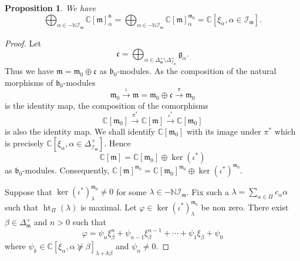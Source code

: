 \documentclass{amsart}
\newtheorem{proposition}[theorem]{Proposition}
\theoremstyle{definition}
\theoremstyle{remark}
\numberwithin{equation}{section}
\newcommand{\height}{\mathop{\mathrm{ht}}\nolimits}
\newcommand{\soc}[1]{\mathcal{I}_{#1}}
\begin{document}
\begin{proposition}\label{invariant-prop}
We have
$$
\bigoplus_{\alpha\in -\mathbb{N}\soc{\mathfrak{m}}} \mathbb{C} [\mathfrak{m}]_{\alpha}^{\mathfrak{n}}
=
\bigoplus_{\alpha\in -\mathbb{N}\soc{\mathfrak{m}}} \mathbb{C} [\mathfrak{m}]_{\alpha}^{\mathfrak{m}_{0}}
= \mathbb{C}[ \xi_{\alpha} , \alpha \in \soc{\mathfrak{m}}].
$$
\end{proposition}
\begin{proof}
Let 
$$
\mathfrak{c} = \bigoplus_{\alpha\in\Delta_{\mathfrak{m}}^{+} \setminus \Delta_{\soc{\mathfrak{m}}}^{+}}
\mathfrak{g}_{\alpha}.
$$
Thus we have $\mathfrak{m} = \mathfrak{m}_{0} \oplus \mathfrak{c}$ as $\mathfrak{b}_{0}$-modules.
As the composition of the natural morphisms of $\mathfrak{b}_{0}$-modules
$$
\mathfrak{m}_{0}\stackrel{\iota}{\longrightarrow} \mathfrak{m} =\mathfrak{m}_{0} \oplus \mathfrak{c} 
\stackrel{\pi}{\longrightarrow} \mathfrak{m}_{0}
$$
is the identity map, the composition of the comorphisms
$$
\mathbb{C}[ \mathfrak{m}_{0}] \stackrel{\pi^{*}}{\longrightarrow} 
\mathbb{C}[ \mathfrak{m}] \stackrel{\iota^{*}}{\longrightarrow} \mathbb{C}[\mathfrak{m}_{0}]
$$
is also the identity map. We shall identify $\mathbb{C}[\mathfrak{m}_{0}]$ with its image under $\pi^{*}$ 
which is precisely $\mathbb{C}[ \xi_{\alpha} , \alpha \in \Delta_{\soc{\mathfrak{m}}}^{+}]$. Hence 
$$
\mathbb{C}[ \mathfrak{m}]  = \mathbb{C}[ \mathfrak{m}_{0}] \oplus \ker (\iota^{*})
$$
as $\mathfrak{b}_{0}$-modules. Consequently, $\mathbb{C}[ \mathfrak{m}]^{\mathfrak{m}_{0}}
= \mathbb{C}[ \mathfrak{m}_{0}]^{\mathfrak{m}_{0}} \oplus \ker (\iota^{*})^{\mathfrak{m}_{0}}$.

Suppose that $\ker (\iota^{*})^{\mathfrak{m}_{0}}_{\lambda} \neq 0$ for some 
$\lambda\in -\mathbb{N}\soc{\mathfrak{m}}$. Fix such a 
$\lambda = \sum_{\alpha\in\Pi} c_{\alpha}\alpha$ such that $\height_{\Pi} (\lambda )$
is maximal. Let 
$\varphi \in \ker (\iota^{*})^{\mathfrak{m}_{0}}_{\lambda}$ be 
non zero. There exist $\beta\in \Delta_{\mathfrak{m}}^{+}$ and $n > 0$ such that
$$
\varphi = \psi_{n} \xi_{\beta}^{n} + \psi_{n-1} \xi_{\beta}^{n-1} + \cdots  + \psi_{1} \xi_{\beta} + \psi_{0}
$$
where $\psi_{k} \in \mathbb{C}[ \xi_{\alpha} , \alpha \not\succcurlyeq \beta]_{\lambda + k \beta}$
and $\psi_{n}\neq 0$. 


\end{proof}
\end{document}
